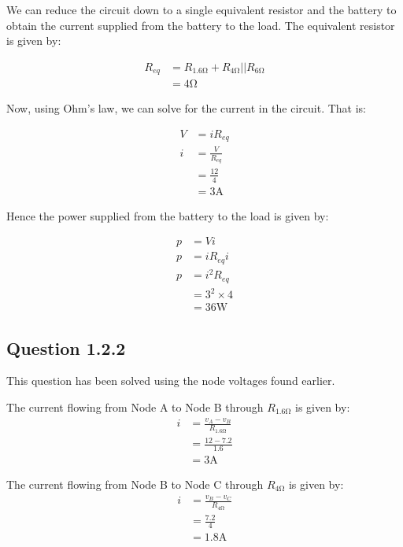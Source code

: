 \documentclass[paper=a4, fontsize=11pt]{scrartcl} %
\numberwithin{equation}{section} %
\numberwithin{figure}{section} %
\numberwithin{table}{section} %
\begin{document}
We can reduce the circuit down to a single equivalent resistor and the battery to obtain the current supplied from the battery to the load. The equivalent resistor is given by:

\begin{align*}
R_{eq} &= R_{1.6\si{\ohm}} + R_{4\si{\ohm}}||R_{6\si{\ohm}} \\
&= 4 \si{\ohm}
\end{align*}

\newpage

Now, using Ohm's law, we can solve for the current in the circuit. That is:

\begin{align*}
V &= iR_{eq} \\
i &= \frac{V}{R_{eq}} \\
&= \frac{12}{4} \\
&= 3 \si{\ampere}
\end{align*}

Hence the power supplied from the battery to the load is given by:

\begin{align*}
p &= Vi \\
p &= iR_{eq}i \\
p &= i^{2}R_{eq} \\
&= 3^2 \times 4 \\
&= 36 \si{\watt}
\end{align*}

\subsection*{Question 1.2.2}

This question has been solved using the node voltages found earlier.

The current flowing from Node A to Node B through $R_{1.6 \si{\ohm}}$ is given by:
\begin{align*}
i &= \frac{v_{A} - v_{B}}{R_{1.6 \si{\ohm}}} \\
&= \frac{12 - 7.2}{1.6} \\
&= 3 \si{\ampere}
\end{align*}

The current flowing from Node B to Node C through $R_{4 \si{\ohm}}$ is given by:
\begin{align*}
i &= \frac{v_{B} - v_{C}}{R_{4 \si{\ohm}}} \\
&= \frac{7.2}{4} \\
&= 1.8 \si{\ampere}
\end{align*}
\end{document}
